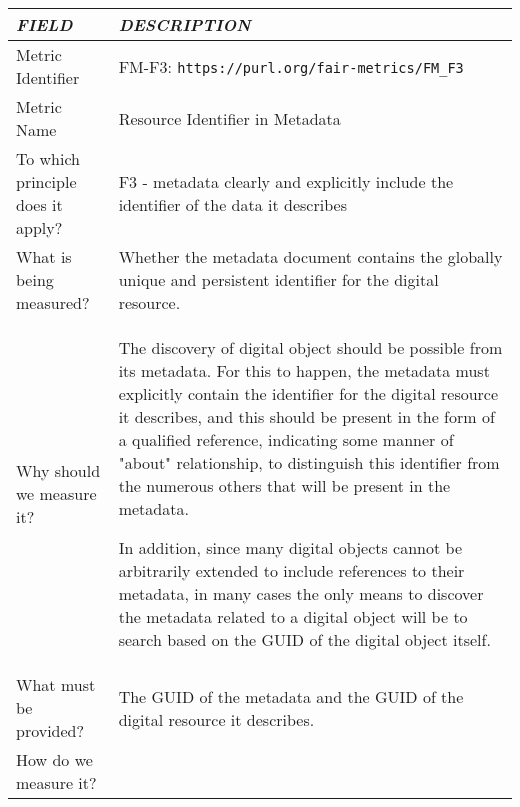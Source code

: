 \documentclass[english]{article}
\begin{document}
\begin{longtable}{|p{5cm}|p{9cm}|}


\hline
\emph{FIELD} & \emph{DESCRIPTION} \\
\hline
Metric Identifier &   FM-F3: \verb"https://purl.org/fair-metrics/FM_F3"
 \\


\hline
Metric Name &   

Resource Identifier in Metadata


 \\



\hline
To which principle does it apply? &   
F3 - metadata clearly and explicitly include the identifier of the data it describes
\\



\hline
What is being measured? & 


Whether the metadata document contains the globally unique and persistent identifier for the digital resource.

\\



\hline
Why should we measure it? & 



The discovery of digital object should be possible from its metadata. For this to happen, the metadata must explicitly contain the identifier for the digital resource it describes, and this should be present in the form of a qualified reference, indicating some manner of "about" relationship, to distinguish this identifier from the numerous others that will be present in the metadata.

In addition, since many digital objects cannot be arbitrarily extended to include references to their metadata, in many cases the only means to discover the metadata related to a digital object will be to search based on the GUID of the digital object itself.

  
\\



\hline
What must be provided? &  


The GUID of the metadata and the GUID of the digital resource it describes.


 \\



\hline
How do we measure it? &  


\end{longtable}
\end{document}
